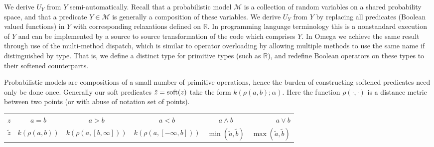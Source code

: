We derive $U_Y$ from $Y$ semi-automatically. 
Recall that a probabilistic model $\mathcal{M}$ is a collection of random variables on a shared probability space, and that a predicate $Y \in \mathcal{M}$ is generally a composition of these variables.
We derive $U_Y$ from $Y$ by replacing all predicates (Boolean valued functions) in $Y$ with corresponding relaxations defined on $\mathbb{R}$.
In programming language terminology this is a nonstandard execution of $Y$ and can be implemented by a source to source transformation of the code which comprises $Y$.
In Omega we achieve the same result through use of the multi-method dispatch, which is similar to operator overloading by allowing multiple methods to use the same name if distinguished by type.  That is, we define a distinct type for primitive types (such as $\mathbb{R}$), and redefine Boolean operators on these types to their softened counterparts.

Probabilistic models are compositions of a small number of primitive operations, hence the burden of constructing softened predicates need only be done once.
Generally our soft predicates $\tilde{z} = \operatorname{soft}(z)$ take the form $k(\rho(a, b); \alpha)$.
Here the function $\rho(\cdot, \cdot)$ is a distance metric between two points (or with abuse of notation set of points).

\begin{center}
\begin{tabular}{ l | c | c | c | c |r }
  \hline		
  $z$ & $a = b$ & $a > b$ & $a < b$ & $a \land b$ & $a \lor b$  \\
  $\tilde{z}$ & $k(\rho(a, b))$ & $k(\rho(a, [b, \infty]))$ & $k(\rho(a, [-\infty, b]))$ & $\min(\tilde{a}, \tilde{b})$ & $\max(\tilde{a}, \tilde{b})$\\
  \hline  
\end{tabular}
\end{center}



